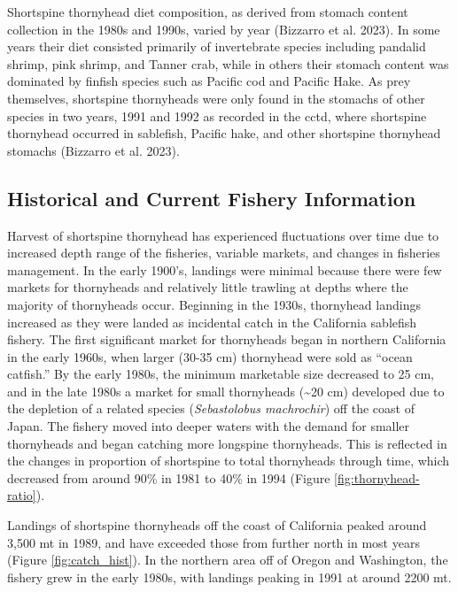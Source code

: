 \documentclass[11pt,
  english,
  letterpaper,
]{article}
\begin{document}
Shortspine thornyhead diet composition, as derived from stomach content collection in the 1980s and 1990s, varied by year (Bizzarro et al. 2023). In some years their diet consisted primarily of invertebrate species including pandalid shrimp, pink shrimp, and Tanner crab, while in others their stomach content was dominated by finfish species such as Pacific cod and Pacific Hake. As prey themselves, shortspine thornyheads were only found in the stomachs of other species in two years, 1991 and 1992 as recorded in the \gls{cctd}, where shortspine thornyhead occurred in sablefish, Pacific hake, and other shortspine thornyhead stomachs (Bizzarro et al. 2023).

\hypertarget{historical-and-current-fishery-information}{%
\subsection{Historical and Current Fishery Information}\label{historical-and-current-fishery-information}}

Harvest of shortspine thornyhead has experienced fluctuations over time due to increased depth range of the fisheries, variable markets, and changes in fisheries management. In the early 1900's, landings were minimal because there were few markets for thornyheads and relatively little trawling at depths where the majority of thornyheads occur. Beginning in the 1930s, thornyhead landings increased as they were landed as incidental catch in the California sablefish fishery. The first significant market for thornyheads began in northern California in the early 1960s, when larger (30-35 cm) thornyhead were sold as ``ocean catfish.'' By the early 1980s, the minimum marketable size decreased to 25 cm, and in the late 1980s a market for small thornyheads (\textasciitilde20 cm) developed due to the depletion of a related species (\emph{Sebastolobus machrochir}) off the coast of Japan. The fishery moved into deeper waters with the demand for smaller thornyheads and began catching more longspine thornyheads. This is reflected in the changes in proportion of shortspine to total thornyheads through time, which decreased from around 90\% in 1981 to 40\% in 1994 (Figure \ref{fig:thornyhead-ratio}).

Landings of shortspine thornyheads off the coast of California peaked around 3,500 mt in 1989, and have exceeded those from further north in most years (Figure \ref{fig:catch_hist}). In the northern area off of Oregon and Washington, the fishery grew in the early 1980s, with landings peaking in 1991 at around 2200 mt.
\end{document}
